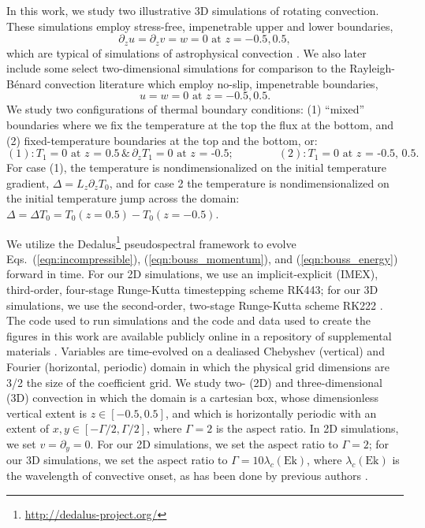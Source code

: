 \documentclass[aps, pre, onecolumn, nofootinbib, notitlepage, groupedaddress, amsfonts, amssymb, amsmath, longbibliography]{revtex4-1}
\newcommand{\RB}{Rayleigh-B\'{e}nard }
\begin{document}
In this work, we study two illustrative 3D simulations of rotating convection. 
These simulations employ stress-free, impenetrable upper and lower boundaries,
\begin{equation}
\partial_z u = \partial_z v = w = 0 \, \, \text{at}\,\,z = -0.5, 0.5,
\label{eqn:vel_bcs}
\end{equation}
which are typical of simulations of astrophysical convection \cite{hurlburt&all1984, cattaneo&all1991, korre&all2017}.
We also later include some select two-dimensional simulations for comparison to the \RB convection literature which employ no-slip, impenetrable boundaries,
\begin{equation}
u = w = 0 \, \, \text{at}\,\,z = -0.5, 0.5.
\label{eqn:vel_bcs}
\end{equation}
We study two configurations of thermal boundary conditions: (1) ``mixed'' boundaries where we fix the temperature at the top the flux at the bottom, and (2) fixed-temperature boundaries at the top and the bottom, or:
\begin{equation}
(1): T_1 = 0 \text{ at $z$ = 0.5} \,\&\, \partial_z T_1 = 0 \text{ at $z$ = -0.5};\qquad\qquad
(2): T_1 = 0 \text{ at $z$ = -0.5, 0.5}.
\end{equation}
For case (1), the temperature is nondimensionalized on the initial temperature gradient, $\Delta = L_z \partial_z T_0$, and for case 2 the temperature is nondimensionalized on the initial temperature jump across the domain: $\Delta = \Delta T_0 =  T_0(z=0.5)-T_0(z=-0.5)$.

We utilize the Dedalus\footnote{\url{http://dedalus-project.org/}} pseudospectral framework \cite{burns&all2016} to evolve Eqs.~(\ref{eqn:incompressible}), (\ref{eqn:bouss_momentum}), and (\ref{eqn:bouss_energy}) forward in time.
For our 2D simulations, we use an implicit-explicit (IMEX), third-order, four-stage Runge-Kutta timestepping scheme RK443; for our 3D simulations, we use the second-order, two-stage Runge-Kutta scheme RK222 \cite{ascher&all1997}. 
The code used to run simulations and the code and data used to create the figures in this work are available publicly online in a repository of supplemental materials \cite{anders&all2020a_supp}.
Variables are time-evolved on a dealiased Chebyshev (vertical) and Fourier (horizontal, periodic) domain in which the physical grid dimensions are 3/2 the size of the coefficient grid.  
We study two- (2D) and three-dimensional (3D) convection in which the domain is a cartesian box, whose dimensionless vertical extent is $z \in [-0.5, 0.5]$, and which is horizontally periodic with an extent of $x, y \in [-\Gamma/2, \Gamma/2]$, where $\Gamma = 2$ is the aspect ratio.
In 2D simulations, we set $v = \partial_y = 0$.
For our 2D simulations, we set the aspect ratio to $\Gamma = 2$; for our 3D simulations, we set the aspect ratio to $\Gamma = 10\lambda_c(\text{Ek})$, where $\lambda_c(\text{Ek})$ is the wavelength of convective onset, as has been done by previous authors \cite{stellmach&all2014}.
\end{document}
